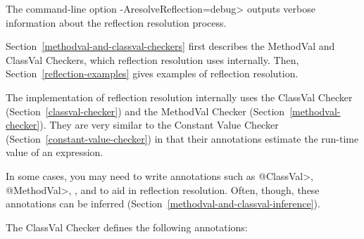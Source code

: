 The command-line option \<-AresolveReflection=debug> outputs verbose information about the reflection resolution process.


Section~\ref{methodval-and-classval-checkers} first describes the MethodVal
and ClassVal Checkers, which reflection resolution uses internally.  Then,
Section~\ref{reflection-examples} gives examples of reflection resolution.



The implementation of reflection resolution internally uses the ClassVal
Checker (Section~\ref{classval-checker}) and the MethodVal Checker
(Section~\ref{methodval-checker}).  They are very similar to the Constant
Value Checker (Section~\ref{constant-value-checker}) in that their
annotations estimate the run-time value of an expression.

In some cases, you may need to write annotations such as \<@ClassVal>,
\<@MethodVal>, , and  to aid in reflection resolution.
Often, though, these annotations can be inferred
(Section~\ref{methodval-and-classval-inference}).



The ClassVal Checker defines the following annotations:

